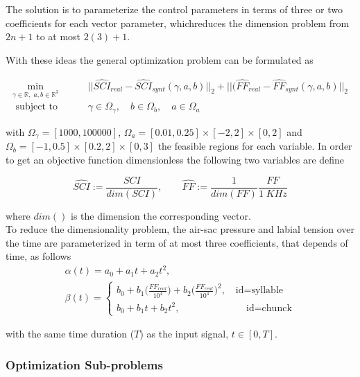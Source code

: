 The solution is to parameterize the control parameters in terms of three or two coefficients for each vector parameter, whichreduces the dimension problem from $2n+1$ to at most $2(3)+1$. 

With these ideas the general optimization problem can be formulated as 

\begin{equation}\label{opt_general_simpl}
\begin{aligned}
\underset{ \gamma \in \mathbb{R},\; a,b\in \mathbb{R}^3}{\text{min}} &\qquad  ||\hat{SCI}_{real} - \hat{SCI}_{synt} ( \gamma,a,b)||_2  + || (\hat{FF}_{real} - \hat{FF}_{synt}(\gamma,a,b)||_2\\
    \text { subject to }  & \qquad \gamma \in \Omega_\gamma, \quad  b \in \Omega_b ,  \quad  a \in \Omega_a
\end{aligned}
\end{equation}

with $\Omega_\gamma = [1000, 100000]$, $\Omega_a=[0.01,0.25]\times[-2,2]\times[0,2]$ and $\Omega_b=[-1,0.5]\times[0.2,2]\times[0,3]$ the feasible regions for each variable. In order to get an objective function dimensionless the following two variables are define

$$
\hat{SCI} := \frac{SCI}{dim(SCI)} , \qquad
\hat{FF}  := \frac{1}{dim(FF)} \frac{FF}{1 \; KHz}
$$

where $dim()$ is the dimension the corresponding vector. \\

To reduce the dimensionality problem, the air-sac pressure and labial tension over the time are parameterized  in term of at most three coefficients, that depends of time, as follows
\begin{gather}\label{eq:alpha-beta_definitions}
\alpha(t) = a_0 + a_1 t + a_2 t^2,  \\
\beta(t) = \begin{cases} 
      b_0  + b_1 \big(\frac{FF_{real}}{10^4}\big) + b_2\big(\frac{FF_{real}}{10^4}\big)^2, \quad \text{id=syllable} \\
      b_0  + b_1 t + b_2 t^2, \qquad \qquad \qquad \;  \; \;  \text{id=chunck}
   \end{cases}
\end{gather}

with the same time duration ($T$) as the input signal, $t\in[0,T]$.

\subsubsection{Optimization Sub-problems}

